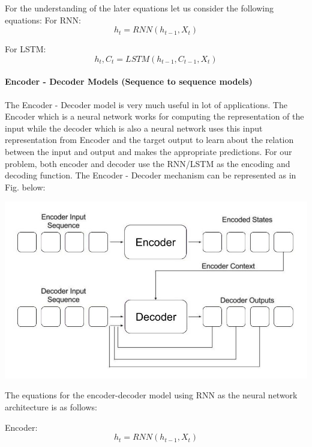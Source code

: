 For the understanding of the later equations let us consider the following equations:
For RNN: \begin{equation} h_{t} = RNN(h_{t-1}, X_{t}) \end{equation}

For LSTM: \begin{equation} h_{t}, C_{t} = LSTM(h_{t-1}, C_{t-1}, X_{t}) \end{equation} 

\paragraph{Encoder - Decoder Models (Sequence to sequence models)}

The Encoder - Decoder model \cite{12} is very much useful in lot of applications. The Encoder which is a neural network works for computing the representation of the input while the decoder which is also a neural network uses this input representation from Encoder and the target output to learn about the relation between the input and output and makes the appropriate predictions. For our problem, both encoder and decoder use the RNN/LSTM as the encoding and decoding function. The Encoder - Decoder mechanism can be represented as in Fig. below:

				\begin{center}
				\includegraphics[width=\linewidth]{figures/Sequence-to-Sequence-Model.jpg}	
				\label{fig: Encoder - Decoder Mechanism}
				\end{center}

The equations for the encoder-decoder model using RNN as the neural network architecture is as follows:
 
Encoder: \begin{equation} h_{t} = RNN(h_{t-1}, X_{t}) \end{equation}


